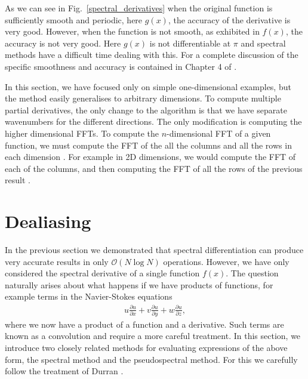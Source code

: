 As we can see in Fig.~\ref{spectral_derivatives} when the original function is sufficiently smooth and periodic, here $g(x)$, the accuracy of the derivative is very good. However, when the function is not smooth, as exhibited in $f(x)$, the accuracy is not very good. Here $g(x)$ is not differentiable at $\pi$ and spectral methods have a difficult time dealing with this. For a complete discussion of the specific smoothness and accuracy is contained in Chapter 4 of \cite{trefethen_spectral}.

In this section, we have focused only on simple one-dimensional examples, but the method easily generalises to arbitrary dimensions. To compute multiple partial derivatives, the only change to the algorithm is that we have separate wavenumbers for the different directions. The only modification is computing the higher dimensional FFTs. To compute the $n$-dimensional FFT of a given function, we must compute the FFT of the all the columns and all the rows in each dimension \cite{kammler}. For example in 2D dimensions, we would compute the FFT of each of the columns, and then computing the FFT of all the rows of the previous result \cite{matlabfft2}. 

\section{Dealiasing} 
In the previous section we demonstrated that spectral differentiation can produce very accurate results in only $\mathcal{O}(N\log N)$ operations. However, we have only considered the spectral derivative of a single function $f(x)$. The question naturally arises about what happens if we have products of functions, for example  terms in the Navier-Stokes equations 
\begin{align}
u\frac{\partial u}{\partial x} + v\frac{\partial u}{\partial y} +w\frac{\partial u}{\partial z},
\end{align}
where we now have a product of a function and a derivative. Such terms are known as a convolution and require a more careful treatment. In this section, we introduce two closely related methods for evaluating expressions of the above form, the spectral method and the pseudospectral method. For this we carefully follow the treatment of Durran \cite{durran}. 

